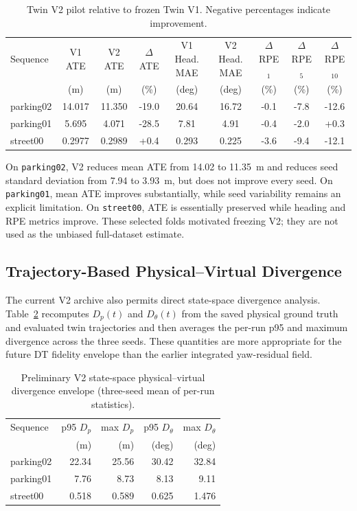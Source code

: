 \documentclass[conference]{IEEEtran}
\newcommand{\Dp}{D_{p}}
\newcommand{\Dtheta}{D_{\theta}}
\begin{document}
\begin{table}[t]
\centering
\caption{Twin V2 pilot relative to frozen Twin V1. Negative percentages indicate improvement.}
\label{tab:v2pilot}
\footnotesize
\begin{tabular}{lcccccccc}
\toprule
Sequence & V1 ATE & V2 ATE & $\Delta$ATE & V1 Head. MAE & V2 Head. MAE & $\Delta$RPE$_1$ & $\Delta$RPE$_5$ & $\Delta$RPE$_{10}$ \\
 & (m) & (m) & (\%) & (deg) & (deg) & (\%) & (\%) & (\%) \\
\midrule
parking02 & 14.017 & 11.350 & -19.0 & 20.64 & 16.72 & -0.1 & -7.8 & -12.6 \\
parking01 & 5.695 & 4.071 & -28.5 & 7.81 & 4.91 & -0.4 & -2.0 & +0.3 \\
street00 & 0.2977 & 0.2989 & +0.4 & 0.293 & 0.225 & -3.6 & -9.4 & -12.1 \\
\bottomrule
\end{tabular}
\end{table}

On \texttt{parking02}, V2 reduces mean ATE from 14.02 to 11.35~m and reduces seed standard deviation from 7.94 to 3.93~m, but does not improve every seed. On \texttt{parking01}, mean ATE improves substantially, while seed variability remains an explicit limitation. On \texttt{street00}, ATE is essentially preserved while heading and RPE metrics improve. These selected folds motivated freezing V2; they are not used as the unbiased full-dataset estimate.

\subsection{Trajectory-Based Physical--Virtual Divergence}
The current V2 archive also permits direct state-space divergence analysis. Table~\ref{tab:envelope} recomputes $\Dp(t)$ and $\Dtheta(t)$ from the saved physical ground truth and evaluated twin trajectories and then averages the per-run p95 and maximum divergence across the three seeds. These quantities are more appropriate for the future DT fidelity envelope than the earlier integrated yaw-residual field.

\begin{table}[t]
\centering
\caption{Preliminary V2 state-space physical--virtual divergence envelope (three-seed mean of per-run statistics).}
\label{tab:envelope}
\footnotesize
\begin{tabular}{lrrrr}
\toprule
Sequence & p95 $\Dp$ & max $\Dp$ & p95 $\Dtheta$ & max $\Dtheta$ \\
 & (m) & (m) & (deg) & (deg) \\
\midrule
parking02 & 22.34 & 25.56 & 30.42 & 32.84 \\
parking01 & 7.76 & 8.73 & 8.13 & 9.11 \\
street00 & 0.518 & 0.589 & 0.625 & 1.476 \\
\bottomrule
\end{tabular}
\end{table}
\end{document}

